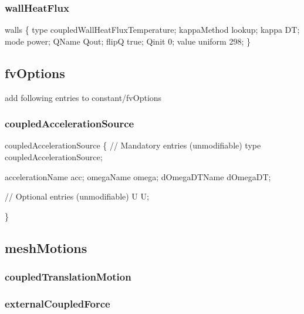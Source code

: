 \subsubsection*{wall\+Heat\+Flux}


\begin{DoxyCode}
walls
\{
    type            coupledWallHeatFluxTemperature;
    kappaMethod     lookup;
    kappa           DT;
    mode            power;
    QName           Qout;
    flipQ           true;
    Qinit           0;
    value           uniform 298;
\}
\end{DoxyCode}


\subsection*{fv\+Options}

add following entries to constant/fv\+Options

\subsubsection*{coupled\+Acceleration\+Source}


\begin{DoxyCode}
coupledAccelerationSource
\{
    // Mandatory entries (unmodifiable)
    type             coupledAccelerationSource;

    accelerationName acc;
    omegaName omega;
    dOmegaDTName dOmegaDT;

    // Optional entries (unmodifiable)
    U                U;

\}
\end{DoxyCode}


\subsection*{mesh\+Motions}

\subsubsection*{coupled\+Translation\+Motion}

\subsubsection*{external\+Coupled\+Force}